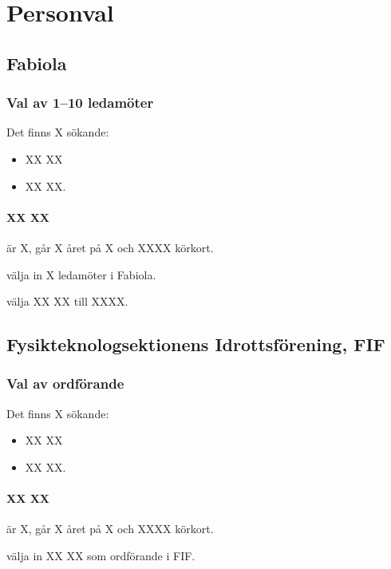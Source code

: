 \documentclass[hidelinks]{sektionsmote}
\begin{document}
\section{Personval}
\subsection{Fabiola}
\subsubsection{Val av 1--10 ledamöter}
Det finns X sökande:
\begin{itemize}
    \item XX XX
    \item XX XX.
\end{itemize}

\paragraph{XX XX} är X, går X året på X och XXXX körkort.

\begin{beslut}
  \item välja in X ledamöter i Fabiola.
\end{beslut}
\begin{beslut}
  \item välja XX XX till XXXX.
\end{beslut}


\subsection{Fysikteknologsektionens Idrottsförening, FIF}
\subsubsection{Val av ordförande}
Det finns X sökande:
\begin{itemize}
    \item XX XX
    \item XX XX.
\end{itemize}

\paragraph{XX XX} är X, går X året på X och XXXX körkort.

\begin{beslut}
  \item välja in XX XX som ordförande i FIF.
\end{beslut}
\end{document}
